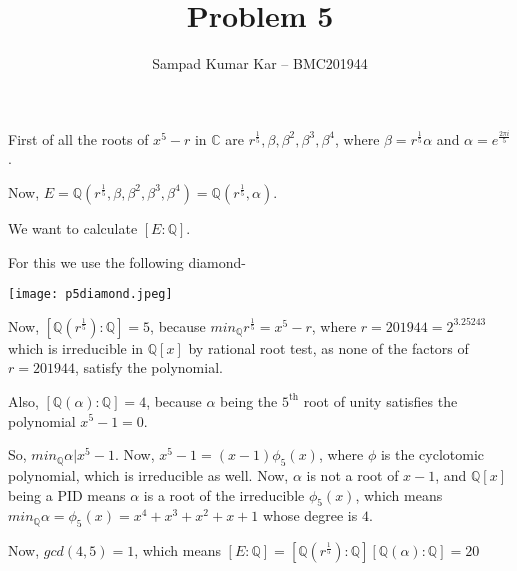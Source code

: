 \documentclass[12pt,a4paper]{article}
\title{Problem 5}
\author{Sampad Kumar Kar -- BMC201944}
\theoremstyle{definition}
\begin{document}
\maketitle

\begin{flushleft}

First of all the roots of $x^5 - r$ in $\mathbb{C}$ are ${r^{\frac{1}{5}},\beta,\beta^2,\beta^3,\beta^4}$, where $\beta = r^{\frac{1}{5}}\alpha$ and $\alpha = e^{\frac{2\pi i}{5}}$.


Now, $E = \mathbb{Q}(r^{\frac{1}{5}},\beta,\beta^2,\beta^3,\beta^4) = \mathbb{Q}(r^{\frac{1}{5}},\alpha)$.

We want to calculate $[E:\mathbb{Q}]$.

\medskip

For this we use the following diamond-

\medskip

\texttt{[image: p5diamond.jpeg]}

\medskip

Now, $[\mathbb{Q}(r^\frac{1}{5}):\mathbb{Q}] = 5$, because $min_{\mathbb{Q}}r^{\frac{1}{5}} = x^5 - r$, where $r = 201944 = 2^3.25243$ which is irreducible in $\mathbb{Q}[x]$ by rational root test, as none of the factors of $r = 201944$, satisfy the polynomial.

\medskip

Also, $[\mathbb{Q}(\alpha):\mathbb{Q}] = 4$, because $\alpha$ being the $5^{\text{th}}$ root of unity satisfies the polynomial $x^5 - 1 = 0$.

So, $min_{\mathbb{Q}}\alpha | x^5 -1$. Now, $x^5-1 = (x-1)\phi_5(x)$, where $\phi$ is the cyclotomic polynomial, which is irreducible as well. Now, $\alpha$ is not a root of $x-1$, and $\mathbb{Q}[x]$ being a PID means $\alpha$ is a root of the irreducible $\phi_5(x)$, which means $min_{\mathbb{Q}}\alpha = \phi_5(x) = x^4 + x^3 + x^2 + x +1$ whose degree is $4$.

\medskip

Now, $gcd(4,5) = 1$, which means $[E:\mathbb{Q}] = [\mathbb{Q}(r^\frac{1}{5}):\mathbb{Q}][\mathbb{Q}(\alpha):\mathbb{Q}] = 20$

\end{flushleft}
\end{document}

